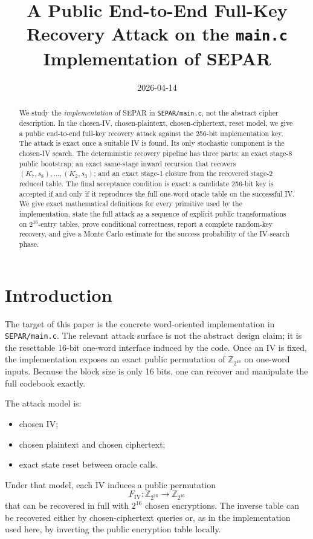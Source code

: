 \documentclass[11pt]{article}
\title{A Public End-to-End Full-Key Recovery Attack on the \texttt{main.c} Implementation of SEPAR}
\author{}
\date{2026-04-14}
\newcommand{\Z}[1]{\mathbb{Z}_{#1}}
\begin{document}
\maketitle

\begin{abstract}
We study the \emph{implementation} of SEPAR in \texttt{SEPAR/main.c}, not the abstract cipher description. In the chosen-IV, chosen-plaintext, chosen-ciphertext, reset model, we give a public end-to-end full-key recovery attack against the 256-bit implementation key. The attack is exact once a suitable IV is found. Its only stochastic component is the chosen-IV search. The deterministic recovery pipeline has three parts: an exact stage-8 public bootstrap; an exact same-stage inward recursion that recovers $(K_7,s_8),\dots,(K_2,s_3)$; and an exact stage-1 closure from the recovered stage-2 reduced table. The final acceptance condition is exact: a candidate 256-bit key is accepted if and only if it reproduces the full one-word oracle table on the successful IV. We give exact mathematical definitions for every primitive used by the implementation, state the full attack as a sequence of explicit public transformations on $2^{16}$-entry tables, prove conditional correctness, report a complete random-key recovery, and give a Monte Carlo estimate for the success probability of the IV-search phase.
\end{abstract}

\section{Introduction}
The target of this paper is the concrete word-oriented implementation in \texttt{SEPAR/main.c}. The relevant attack surface is not the abstract design claim; it is the resettable 16-bit one-word interface induced by the code. Once an IV is fixed, the implementation exposes an exact public permutation of $\Z{2^{16}}$ on one-word inputs. Because the block size is only 16 bits, one can recover and manipulate the full codebook exactly.

The attack model is:
\begin{itemize}[leftmargin=1.5em]
\item chosen IV;
\item chosen plaintext and chosen ciphertext;
\item exact state reset between oracle calls.
\end{itemize}

Under that model, each IV induces a public permutation
\[
F_{\mathrm{IV}}:\Z{2^{16}}\to\Z{2^{16}}
\]
that can be recovered in full with $2^{16}$ chosen encryptions. The inverse table can be recovered either by chosen-ciphertext queries or, as in the implementation used here, by inverting the public encryption table locally.
\end{document}
